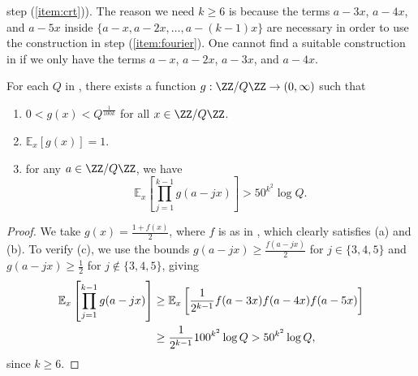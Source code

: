 \documentclass[11pt,reqno]{amsart}
\begin{document}
step (\ref{item:crt})).
The reason we need $k\geq 6$ is because the terms $a-3x$, $a-4x$,
and $a-5x$ inside $\{a-x,a-2x,\dots,a-(k-1)x\}$ are necessary 
in order to use the construction in step (\ref{item:fourier}).
One cannot find a suitable construction in 
 if we only have 
the terms $a-x$, $a-2x$, $a-3x$, and $a-4x$.
\begin{lemma}
\label{lem:smoothing}
For each $Q$ in ,
there exists a function $g : \ZZ/Q\ZZ\to (0,\infty)$
such that 
\begin{enumerate}[label=(\alph*)]
\item $0<g(x) < Q^{\frac 1{100k}}$ for all $x\in \ZZ/Q\ZZ$.
\item $\mathbb E_x[g(x)] = 1$.
\item for any $a\in \ZZ/Q\ZZ$, we have
$$\mathbb E_x\left[\prod_{j=1}^{k-1} g(a-jx)\right] > 50^{k^2}\log Q.$$
\end{enumerate}
\end{lemma}
\begin{proof}
We take $g(x) = \frac{1+f(x)}2$,
where $f$ is as in ,
which clearly satisfies (a) and (b).
To verify (c), we use the bounds $g(a-jx) \geq \frac{f(a-jx)}2$
for $j\in\{3,4,5\}$ and $g(a-jx) \geq \frac 12$
for $j\notin\{3,4,5\}$, giving
\begin{align*}
\mathbb E_x\left[\prod_{j=1}^{k-1} g(a-jx)\right]
&\geq \mathbb E_x\left[\frac 1{2^{k-1}} f(a-3x)f(a-4x)f(a-5x)\right] \\
&\geq \frac 1{2^{k-1}}100^{k^2}\log Q 
> 50^{k^2}\log Q, \qedhere
\end{align*}
since $k\geq 6$.
\end{proof}
\end{document}

